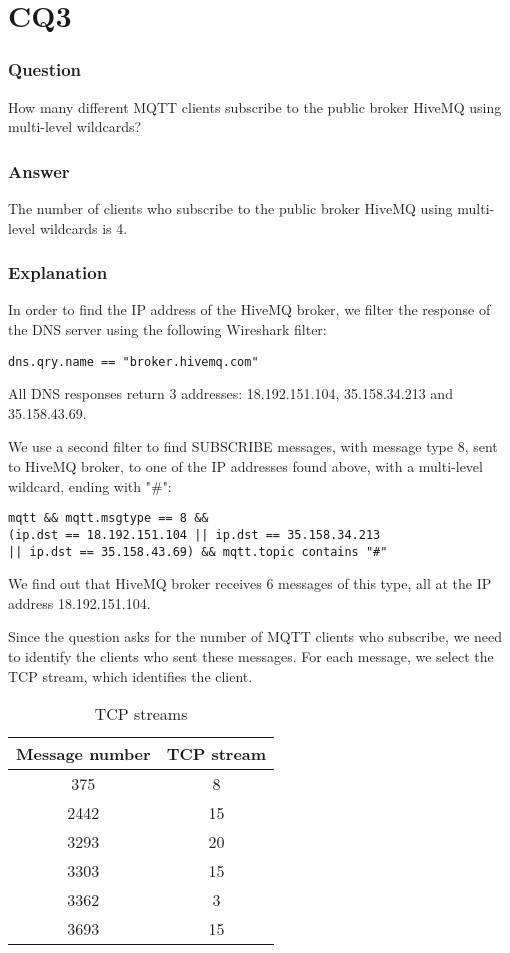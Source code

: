 \section{CQ3}
\subsubsection{Question}
How many different MQTT clients subscribe to the public broker HiveMQ using multi-level wildcards?

\subsubsection{Answer}
The number of clients who subscribe to the public broker HiveMQ using multi-level wildcards is 4.

\subsubsection{Explanation}
In order to find the IP address of the HiveMQ broker, we filter the response of the DNS server using the following Wireshark filter:
\begin{verbatim}
dns.qry.name == "broker.hivemq.com"
\end{verbatim}
All DNS responses return 3 addresses: 18.192.151.104, 35.158.34.213 and 35.158.43.69.

We use a second filter to find SUBSCRIBE messages, with message type 8, sent to HiveMQ broker, to one of the IP addresses found above, with a multi-level wildcard, ending with "\#": 
\begin{verbatim}
mqtt && mqtt.msgtype == 8 && 
(ip.dst == 18.192.151.104 || ip.dst == 35.158.34.213 
|| ip.dst == 35.158.43.69) && mqtt.topic contains "#"
\end{verbatim}
We find out that HiveMQ broker receives 6 messages of this type, all at the IP address 18.192.151.104.

Since the question asks for the number of MQTT clients who subscribe, we need to identify the clients who sent these messages. For each message, we select the TCP stream, which identifies the client.\\

\begin{table}[H]
\centering 
\begin{tabular}{| c | c |}
	\hline 
	\rowcolor{bluepoli!40}
	\textbf{Message number} & \textbf{TCP stream}\T\B \\
	\hline 
	375 & 8 \T\B\\
	2442 & 15 \T\B\\
	3293 & 20 \T\B\\
	3303 & 15 \T\B\\
	3362 & 3 \T\B\\
	3693  & 15 \T\B\\
	\hline
\end{tabular}
\\[10pt]
\caption{TCP streams}
\label{table:tcp_streams}
\end{table}

